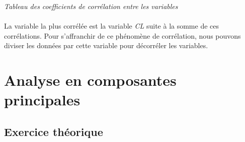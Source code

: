 \documentclass[a4paper, 10pt]{article}
\begin{document}
\textit{Tableau des coefficients de corr\'elation entre les variables}\\ \\
La variable la plus corr\'el\'ee est la variable \textit{CL} suite à la somme de ces corr\'elations.
Pour s'affranchir de ce ph\'enom\`ene de corr\'elation, nous pouvons diviser les donn\'ees par cette variable pour d\'ecorr\'eler
les variables.

\section{Analyse en composantes principales}
\subsection{Exercice th\'eorique}
\end{document}
